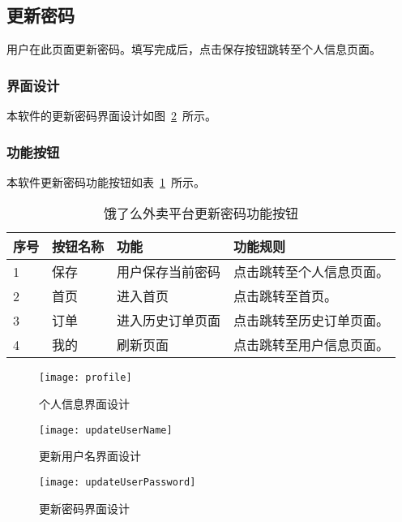 \subsection{更新密码}
用户在此页面更新密码。填写完成后，点击保存按钮跳转至个人信息页面。
\subsubsection{界面设计}
本软件的更新密码界面设计如图~\ref{fig:updateUserPassword}~所示。
\subsubsection{功能按钮}
本软件更新密码功能按钮如表~\ref{tab:table15}~所示。
\begin{table}[htbp]
    \caption{饿了么外卖平台更新密码功能按钮}\label{tab:table15}
    \vspace{0.5em}\wuhao
    \begin{tabularx}{\textwidth}{lllX}
    \toprule[1.5pt]
    序号 & 按钮名称 & 功能 & 功能规则 \\ 
    \midrule[1pt]
    1 & 保存 & 用户保存当前密码 & 点击跳转至个人信息页面。 \\
    2 & 首页 & 进入首页 & 点击跳转至首页。 \\
    3 & 订单 & 进入历史订单页面 & 点击跳转至历史订单页面。 \\
    4 & 我的 & 刷新页面 & 点击跳转至用户信息页面。 \\
\bottomrule[1.5pt]
\end{tabularx}
\vspace{\baselineskip}
\end{table}
\begin{figure}[htbp]
    \centering
    \begin{minipage}{0.4\textwidth}
    \centering
    \texttt{[image: profile]}
    \caption{个人信息界面设计}\label{fig:profile}
    \end{minipage}
    \begin{minipage}{0.4\textwidth}
    \centering
    \texttt{[image: updateUserName]}
    \caption{更新用户名界面设计}\label{fig:updateUserName}
    \end{minipage}
    \vspace{\baselineskip}
\end{figure}
\begin{figure}[htbp]
    \centering
    \texttt{[image: updateUserPassword]}
    \caption{更新密码界面设计}\label{fig:updateUserPassword}
    \vspace{\baselineskip}
\end{figure}